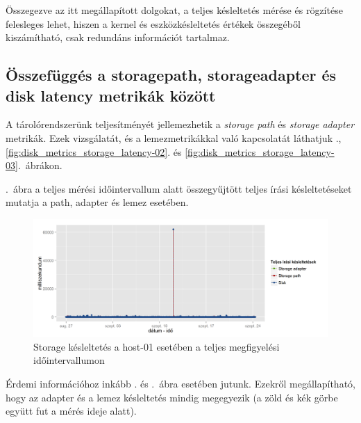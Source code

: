 \documentclass[a4paper,10pt,titlepage]{article}
\begin{document}
Összegezve az itt megállapított dolgokat, a teljes késleltetés mérése és rögzítése felesleges lehet, hiszen a kernel és eszközkésleltetés értékek összegéből kiszámítható, csak redundáns információt tartalmaz.

\clearpage

\subsection{Összefüggés a storagepath, storageadapter és disk latency metrikák között}

A tárolórendszerünk teljesítményét jellemezhetik a \textit{storage path} és \textit{storage adapter} metrikák. Ezek vizsgálatát, és a lemezmetrikákkal való kapcsolatát láthatjuk ., \ref{fig:disk_metrics_storage_latency-02}. és \ref{fig:disk_metrics_storage_latency-03}.~ábrákon.

.~ábra a teljes mérési időintervallum alatt összegyűjtött teljes írási késleltetéseket mutatja a path, adapter és lemez esetében. 

\begin{figure}[ht!]
\centering
\includegraphics[width=1.00\textwidth]{figures/disk_metrics_storage_latency-20120826230140-20120924083120.png}
\caption{ Storage késleltetés a host-01 esetében a teljes megfigyelési időintervallumon \label{fig:disk_metrics_storage_latency-01}}
\end{figure}

Érdemi információhoz inkább . és .~ábra esetében jutunk. Ezekről megállapítható, hogy az adapter és a lemez késleltetés mindig megegyezik (a zöld és kék görbe együtt fut a mérés ideje alatt).
\end{document}
